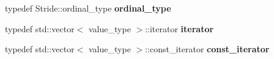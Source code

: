 \begin{DoxyCompactItemize}
\item 
\hypertarget{classbtas_1_1_tensor_a05a07e6d179c284576f15fbe851b9915}{
typedef Stride::ordinal\_\-type {\bfseries ordinal\_\-type}}
\label{classbtas_1_1_tensor_a05a07e6d179c284576f15fbe851b9915}

\item 
\hypertarget{classbtas_1_1_tensor_ac99e3dfd86bd5b85248369a1939e1ce7}{
typedef std::vector$<$ value\_\-type $>$::iterator {\bfseries iterator}}
\label{classbtas_1_1_tensor_ac99e3dfd86bd5b85248369a1939e1ce7}

\item 
\hypertarget{classbtas_1_1_tensor_a13f2d53a05ee8bc8014135669aba8f5f}{
typedef std::vector$<$ value\_\-type $>$::const\_\-iterator {\bfseries const\_\-iterator}}
\label{classbtas_1_1_tensor_a13f2d53a05ee8bc8014135669aba8f5f}

\end{DoxyCompactItemize}
